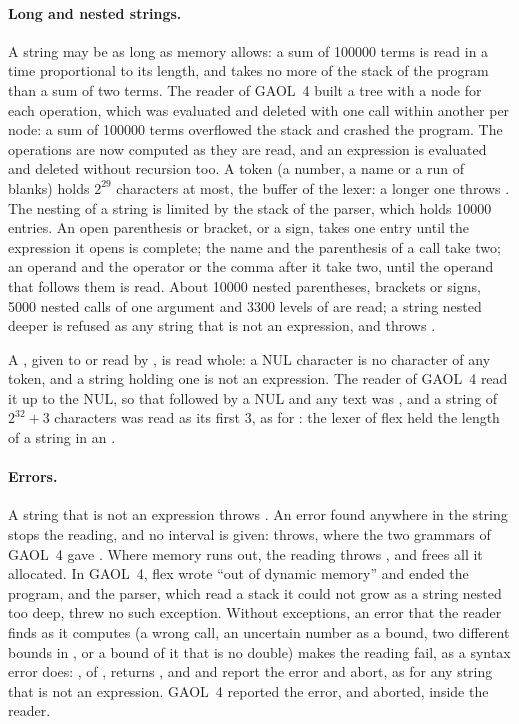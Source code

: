 \paragraph{Long and nested strings.} A string may be as long as memory
allows: a sum of 100000 terms is read in a time proportional to its length,
and takes no more of the stack of the program than a sum of two
terms.\newinvfive{} The reader of GAOL~4 built a tree with a node for each
operation, which was evaluated and deleted with one call within another per
node: a sum of 100000 terms overflowed the stack and crashed the program.
The operations are now computed as they are read, and an expression is
evaluated and deleted without recursion too. A token (a number, a name or a
run of blanks) holds $2^{29}$ characters at most, the buffer of the lexer: a
longer one throws . The nesting of a string is limited
by the stack of the parser, which holds 10000 entries. An open parenthesis
or bracket, or a sign, takes one entry until the expression it opens is
complete; the name and the parenthesis of a call take two; an operand and
the operator or the comma after it take two, until the operand that follows
them is read. About 10000 nested parentheses, brackets or signs, 5000 nested
calls of one argument and 3300 levels of  are read; a
string nested deeper is refused as any string that is not an expression,
and throws .

A , given to  or read by
, is read whole: a NUL character is no character of any
token, and a string holding one is not an expression.\newinvfive{} The
reader of GAOL~4 read it up to the NUL, so that  followed by
a NUL and any text was , and a string of $2^{32}+3$ characters
was read as its first 3, as  for : the
lexer of flex held the length of a string in an .

\paragraph{Errors.} A string that is not an expression throws
. An error found anywhere in the string stops
the reading, and no interval is given: 
throws, where the two grammars of GAOL~4 gave
\itv{-\infty}{+\infty}.\newinvfive{} Where memory runs out, the reading
throws , and frees all it allocated.\newinvfive{} In
GAOL~4, flex wrote ``out of dynamic memory'' and ended the program, and the
parser, which read a stack it could not grow as a string nested too deep,
threw no such exception. Without exceptions, an error that the reader finds
as it computes (a wrong call, an uncertain number as a bound, two different
bounds in , or a bound of it that is no double) makes the
reading fail, as a syntax error does: , of
, returns
, and  and 
report the error and abort, as for any string that is not an
expression.\newinvfive{} GAOL~4 reported the error, and aborted, inside the
reader.

